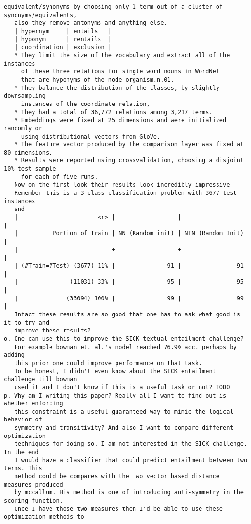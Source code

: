 \documentclass[12pt,answers]{exam} %
\begin{document}
{\begin{Verbatim}[fontsize=\small]
   equivalent/synonyms by choosing only 1 term out of a cluster of synonyms/equivalents,
   also they remove antonyms and anything else.
   | hypernym     | entails   |
   | hyponym      | rentails  |
   | coordination | exclusion |
   * They limit the size of the vocabulary and extract all of the instances
     of these three relations for single word nouns in WordNet
     that are hyponyms of the node organism.n.01.
   * They balance the distribution of the classes, by slightly downsampling
     instances of the coordinate relation,
   * They had a total of 36,772 relations among 3,217 terms.
   * Embeddings were fixed at 25 dimensions and were initialized randomly or
     using distributional vectors from GloVe.
   * The feature vector produced by the comparison layer was fixed at 80 dimensions.
   * Results were reported using crossvalidation, choosing a disjoint 10% test sample
     for each of five runs.
   Now on the first look their results look incredibly impressive
   Remember this is a 3 class classification problem with 3677 test instances
   and
   |                       <r> |                  |                   |
   |          Portion of Train | NN (Random init) | NTN (Random Init) |
   |---------------------------+------------------+-------------------|
   | (#Train=#Test) (3677) 11% |               91 |                91 |
   |               (11031) 33% |               95 |                95 |
   |              (33094) 100% |               99 |                99 |
   Infact these results are so good that one has to ask what good is it to try and
   improve these results?
o. One can use this to improve the SICK textual entailment challenge?
   For example bowman et. al.'s model reached 76.9% acc. perhaps by adding
   this prior one could improve performance on that task.
   To be honest, I didn't even know about the SICK entailment challenge till bowman
   used it and I don't know if this is a useful task or not? TODO
p. Why am I writing this paper? Really all I want to find out is whether enforcing
   this constraint is a useful guaranteed way to mimic the logical behavior of
   symmetry and transitivity? And also I want to compare different optimization
   techniques for doing so. I am not interested in the SICK challenge. In the end
   I would have a classifier that could predict entailment between two terms. This
   method could be compares with the two vector based distance measures produced
   by mccallum. His method is one of introducing anti-symmetry in the scoring function.
   Once I have those two measures then I'd be able to use these optimization methods to

\end{Verbatim}}
\end{document}
